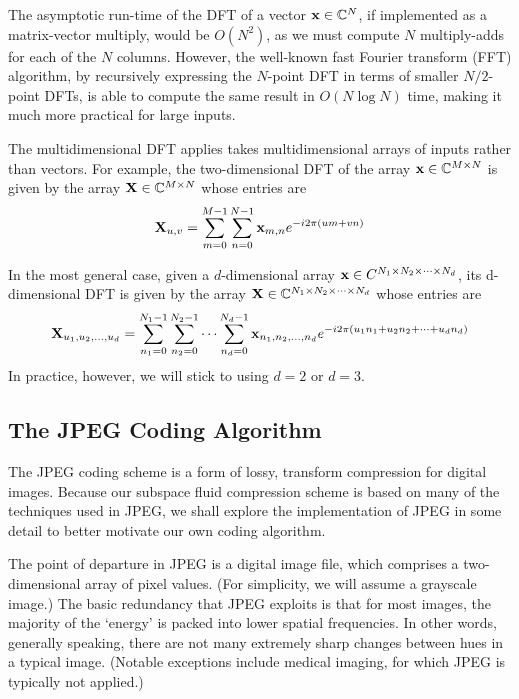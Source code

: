 The asymptotic run-time of the DFT of a vector $\mathbf{x} \in \mathbb{C}^N$, if implemented as a matrix-vector multiply, would be $O(N^2)$, as we must compute $N$ multiply-adds for each of the $N$ columns. However, the well-known fast Fourier transform (FFT) algorithm, by recursively expressing the $N$-point DFT in terms of smaller $N/2$-point DFTs, is able to compute the same result in $O(N \log{N})$ time, making it much more practical for large inputs.~\cite{1965-cooley}

The multidimensional DFT applies takes multidimensional arrays of inputs rather than vectors. For example, the two-dimensional DFT of the array $\mathbf{x} \in \mathbb{C}^{M \times N}$ is given by
the array $\mathbf{X} \in \mathbb{C}^{M \times N}$ whose entries are
\begin{equation}
	\mathbf{X}_{u,v} = \sum_{m=0}^{M-1} \sum_{n=0}^{N-1} \mathbf{x}_{m, n} e^{-i 2 \pi \left(um + vn\right)}
\end{equation}

In the most general case, given a $d$-dimensional array $\mathbf{x} \in C^{N_1 \times N_2 \times \cdots \times N_d}$, its d-dimensional DFT is given by the array $\mathbf{X} \in \mathbb{C}^{N_1 \times N_2 \times \cdots \times N_d}$ whose entries are
\begin{equation}
	\mathbf{X}_{u_1, u_2, \dots, u_d} = \sum_{n_1=0}^{N_1-1} \sum_{n_2=0}^{N_2-1} \cdots \sum_{n_d = 0}^{N_d -1} \mathbf{x}_{n_1, n_2, \dots, n_d} e^{-i 2 \pi \left(u_1 n_1 + u_2 n_2 + \cdots + u_d n_d\right)}
\end{equation}
In practice, however, we will stick to using $d=2$ or $d=3$.
\subsection{The JPEG Coding Algorithm} \label{sec:jpeg}
The JPEG coding scheme is a form of lossy, transform compression for digital images. Because our subspace fluid compression scheme is based on many of the techniques used in JPEG, we shall explore the implementation of JPEG in some detail to better motivate our own coding algorithm. 

The point of departure in JPEG is a digital image file, which comprises a two-dimensional array of pixel values. (For simplicity, we will assume a grayscale image.) The basic redundancy that JPEG exploits is that for most images, the majority of the `energy' is packed into lower spatial frequencies. In other words, generally speaking, there are not many extremely sharp changes between hues in a typical image. (Notable exceptions include medical imaging, for which JPEG is typically not applied.) 

